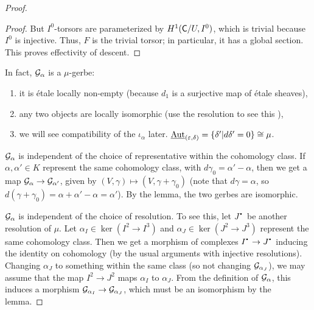 \begin{proof}
\begin{proof}
 But $I^0$-torsors are parameterized by $H^1(\text{\sf C}/U,I^0)$, which is trivial because $I^0$ is injective. Thus, $F$ is the trivial torsor; in particular, it has a global section. This proves effectivity of descent.
 \renewcommand{\qedsymbol}{$\square_{\text{Claim}}$}
 \end{proof}
 In fact, $\mathcal{G}_\alpha$ is a $\mu$-gerbe:
 \begin{enumerate}
   \item it is \'etale locally non-empty (because $d_1$ is a surjective map of \'etale
   sheaves),
   \item any two objects are locally isomorphic (use the resolution to see this
   \anton{}),
   \item we will see compatibility of the $\iota_\alpha$ later. $\operatorname{\underline{Aut}}_{(\varepsilon,\delta)}=\{\delta'|d\delta'=0\}\cong\mu$.
 \end{enumerate}
 
 $\mathcal{G}_\alpha$ is independent of the choice of representative within the cohomology class. If $\alpha,\alpha'\in K$ represent the same cohomology class, with $d\gamma_0=\alpha'-\alpha$, then we get a map $\mathcal{G}_{\alpha}\to \mathcal{G}_{\alpha'}$, given by $(V,\gamma)\mapsto (V,\gamma+\gamma_0)$ (note that $d\gamma=\alpha$, so $d(\gamma+\gamma_0)=\alpha+\alpha'-\alpha=\alpha'$). By the lemma, the two gerbes are isomorphic.

 $\mathcal{G}_\alpha$ is independent of the choice of resolution. To see this, let $J^\udot$ be another resolution of $\mu$. Let $\alpha_I\in \ker(I^2\to I^3)$ and $\alpha_J\in\ker(J^2\to J^3)$ represent the same cohomology class. Then we get a morphism of complexes $I^\udot\to J^\udot$ inducing the identity on cohomology (by the usual arguments with injective resolutions). Changing $\alpha_J$ to something within the same class (so not changing $\mathcal{G}_{\alpha_J}$), we may assume that the map $I^2\to J^2$ maps $\alpha_I$ to $\alpha_J$. From the definition of $\mathcal{G}_\alpha$, this induces a morphism $\mathcal{G}_{\alpha_I}\to \mathcal{G}_{\alpha_J}$, which must be an isomorphism by the lemma.


\end{proof}

